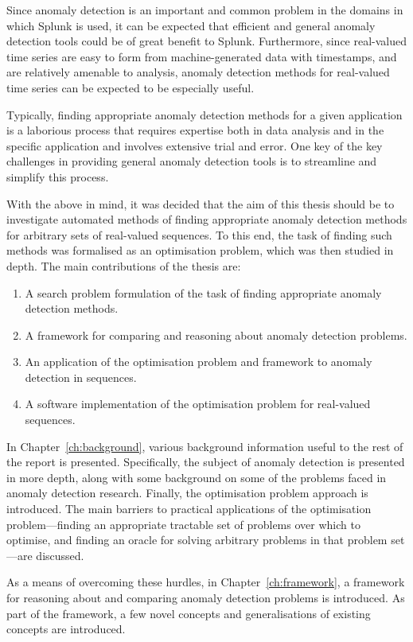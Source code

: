 Since anomaly detection is an important and common problem in the domains in which Splunk is used, it can be expected that efficient and general anomaly detection tools could be of great benefit to Splunk. Furthermore, since real-valued time series are easy to form from machine-generated data with timestamps, and are relatively amenable to analysis, anomaly detection methods for real-valued time series can be expected to be especially useful.

Typically, finding appropriate anomaly detection methods for a given application is a laborious process that requires expertise both in data analysis and in the specific application and involves extensive trial and error. One key of the key challenges in providing general anomaly detection tools is to streamline and simplify this process.

With the above in mind, it was decided that the aim of this thesis should be to investigate automated methods of finding appropriate anomaly detection methods for arbitrary sets of real-valued sequences. To this end, the task of finding such methods was formalised as an optimisation problem, which was then studied in depth. The main contributions of the thesis are:
\begin{enumerate}
    \item A search problem formulation of the task of finding appropriate anomaly detection methods.
    \item A framework for comparing and reasoning about anomaly detection problems.
    \item An application of the optimisation problem and framework to anomaly detection in sequences.
    \item A software implementation of the optimisation problem for real-valued sequences.
\end{enumerate}

In Chapter~\ref{ch:background}, various background information useful to the rest of the report is presented. Specifically, the subject of anomaly detection is presented in more depth, along with some background on some of the problems faced in anomaly detection research. Finally, the optimisation problem approach is introduced. The main barriers to practical applications of the optimisation problem---finding an appropriate tractable set of problems over which to optimise, and finding an oracle for solving arbitrary problems in that problem set---are discussed.

As a means of overcoming these hurdles, in Chapter~\ref{ch:framework}, a framework for reasoning about and comparing anomaly detection problems is introduced. As part of the framework, a few novel concepts and generalisations of existing concepts are introduced.

